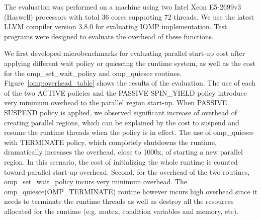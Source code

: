 The evaluation was performed on a machine using two Intel\regtm{} Xeon\regtm{} E5-2699v3 (Haswell) processors with total 36 cores supporting 72 threads. We use the latest
LLVM compiler version 3.8.0 for evaluating IOMP implementation. Test programs were designed to evaluate the overhead of these functions. 

We first developed microbenchmarks for evaluating parallel start-up cost after applying different wait policy or 
quiescing the runtime system, as well as the cost for the {\sf omp\_set\_wait\_policy} and {\sf omp\_quiesce} 
routines.  
Figure~\ref{omp:overhead_table} shows the results of the evaluation. 
The use of each of the two {\sf ACTIVE} policies and the {\sf PASSIVE SPIN\_YIELD} policy 
introduce very minimum overhead to the {\sf parallel} region start-up. 
When {\sf PASSIVE SUSPEND} policy is applied, we observed significant increase of overhead of creating {\sf parallel} regions, 
which can be explained by the cost to suspend and resume the runtime threads when the policy is in effect. 
The use of {\sf omp\_quiesce} with {\sf TERMINATE} policy, which completely shutdowns the 
runtime, dramatically increases the overhead, close to 1000x, of starting a new {\sf parallel} region. In this 
scenario, the cost of initializing the whole runtime is counted toward {\sf parallel} start-up overhead. Second, 
for the overhead of the two routines, {\sf omp\_set\_wait\_policy} incurs very minimum overhead. The 
{\sf omp\_quiesce(OMP\_TERMINATE)} routine however incurs high overhead since it needs to terminate the runtime threads as well as 
destroy all the resources allocated for the runtime (e.g. mutex, condition variables and memory, etc). 



